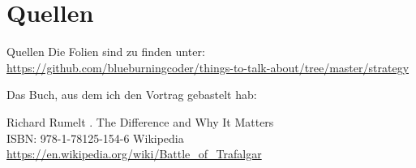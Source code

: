 \documentclass[12pt,compress,ngerman,utf8,t]{beamer}
\begin{document}
\section{Quellen}
\begin{frame}{Quellen}
    Die Folien sind zu finden unter: \\
    \url{https://github.com/blueburningcoder/things-to-talk-about/tree/master/strategy}


    Das Buch, aus dem ich den Vortrag gebastelt hab:

    \begin{thebibliography}{10}
    \beamertemplatebookbibitems
        Richard Rumelt
        .
        \newblock The Difference and Why It Matters \\
                  ISBN: 978-1-78125-154-6
    \beamertemplatearticlebibitems
        Wikipedia
        \newblock \url{https://en.wikipedia.org/wiki/Battle\_of\_Trafalgar}
    \end{thebibliography}


\end{frame}
\end{document}
